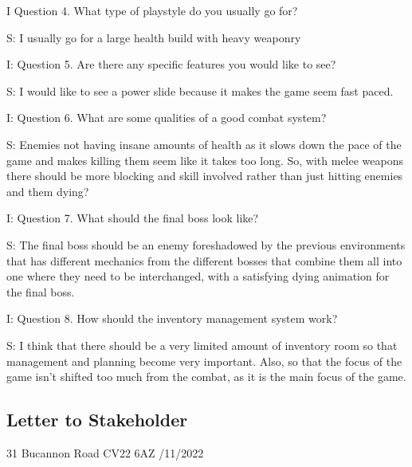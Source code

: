 \documentclass{article}
\newcommand{\parBr}{\vspace{5mm}}%
\begin{document}
\parBr

I Question 4. What type of playstyle do you usually go for? 

\parBr

S: I usually go for a large health build with heavy weaponry 

\parBr

I: Question 5. Are there any specific features you would like to see? 

\parBr

S: I would like to see a power slide because it makes the game seem fast paced. 

\parBr

I: Question 6. What are some qualities of a good combat system? 

\parBr

S: Enemies not having insane amounts of health as it slows down the pace of the game and makes killing them seem like it takes too long. So, with melee weapons there should be more blocking and skill involved rather than just hitting enemies and them dying? 

\parBr

I: Question 7. What should the final boss look like? 

\parBr

S: The final boss should be an enemy foreshadowed by the previous environments that has different mechanics from the different bosses that combine them all into one where they need to be interchanged, with a satisfying dying animation for the final boss.  

\parBr

I: Question 8. How should the inventory management system work? 

\parBr

S: I think that there should be a very limited amount of inventory room so that management and planning become very important. Also, so that the focus of the game isn't shifted too much from the combat, as it is the main focus of the game. 

\subsection{Letter to Stakeholder}
\begin{flushright}
31 Bucannon Road \linebreak CV22 6AZ /11/2022
\end{flushright}
\end{document}
